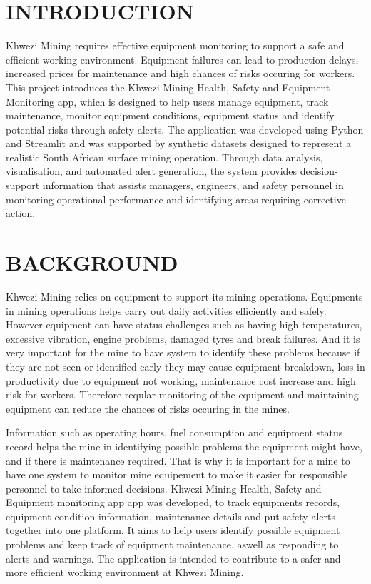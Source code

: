 \documentclass[
]{article}
\begin{document}
\section{INTRODUCTION}

Khwezi Mining requires effective equipment monitoring to support a safe and efficient working environment. Equipment failures can lead to production delays, increased prices for maintenance and high chances of risks occuring for workers. This project introduces the Khwezi Mining Health, Safety and Equipment Monitoring app, which is designed to help users manage equipment, track maintenance, monitor equipment conditions, equipment status and identify potential risks through safety alerts.  The application was developed using Python and Streamlit and was supported by synthetic datasets designed to represent a realistic South African surface mining operation. Through data analysis, visualisation, and automated alert generation, the system provides decision-support information that assists managers, engineers, and safety personnel in monitoring operational performance and identifying areas requiring corrective action. 

\section{BACKGROUND}

Khwezi Mining relies on equipment to support its mining operations. Equipments in mining operations helps carry out daily activities efficiently and safely. However equipment can have status challenges such as having high temperatures, excessive vibration, engine problems, damaged tyres and break failures.  And it is very important for the mine to have system to identify these problems because if they are not seen or identified early they may cause equipment breakdown, loss in productivity due to equipment not working, maintenance cost increase and high risk for workers. Therefore reqular monitoring of the equipment and maintaining equipment can reduce the chances of risks occuring in the mines. 

Information such as operating hours, fuel consumption and equipment status record helps the mine in identifying possible problems the equipment might have, and if there is maintenance required.  That is why it is important for a mine to have one system to monitor mine equipement to make it easier for responsible personnel to take informed decisions. Khwezi Mining Health, Safety and Equipment monitoring app app was developed, to track equipments records, equipment condition information, maintenance details and put safety alerts together into one platform.  It aims to help users identify possible equipment problems and keep track of equipment maintenance, aswell as responding to alerts and warnings. The application is intended to contribute to a safer and more efficient working environment at Khwezi Mining. 
\end{document}
